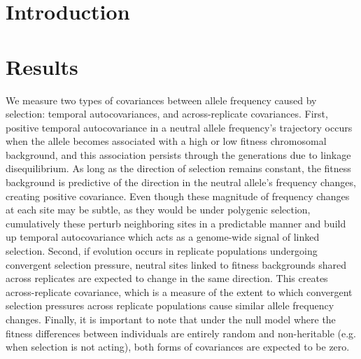 \documentclass[11pt]{article}
\title{}
\author{}
\begin{document}
\maketitle

\section{Introduction}

\section{Results}


We measure two types of covariances between allele frequency caused by
selection: temporal autocovariances, and across-replicate covariances. First,
positive temporal autocovariance in a neutral allele frequency's trajectory
occurs when the allele becomes associated with a high or low fitness
chromosomal background, and this association persists through the generations
due to linkage disequilibrium. As long as the direction of selection remains
constant, the fitness background is predictive of the direction in the neutral
allele's frequency changes, creating positive covariance. Even though these
magnitude of frequency changes at each site may be subtle, as they would be
under polygenic selection, cumulatively these perturb neighboring sites in a
predictable manner and build up temporal autocovariance which acts as a
genome-wide signal of linked selection. Second, if evolution occurs in
replicate populations undergoing convergent selection pressure, neutral sites
linked to fitness backgrounds shared across replicates are expected to change
in the same direction. This creates across-replicate covariance, which is a
measure of the extent to which convergent selection pressures across replicate
populations cause similar allele frequency changes. Finally, it is important to
note that under the null model where the fitness differences between
individuals are entirely random and non-heritable (e.g. when selection is not
acting), both forms of covariances are expected to be zero. 
\end{document}
